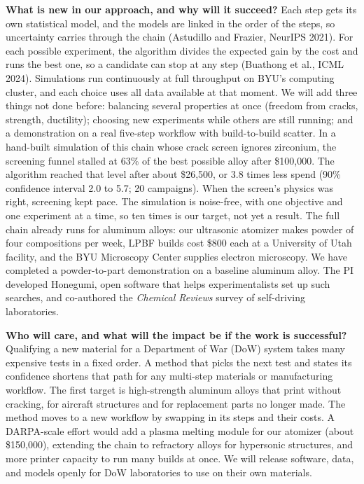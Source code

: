 \documentclass[12pt,letterpaper]{article}
\newcommand{\q}[1]{\textbf{#1}\enspace}
\begin{document}
\q{What is new in our approach, and why will it succeed?}
Each step gets its own statistical model, and the models are linked in the
order of the steps, so uncertainty carries through the chain (Astudillo and
Frazier, NeurIPS 2021). For each possible experiment, the algorithm divides
the expected gain by the cost and runs the best one, so a candidate can stop
at any step (Buathong et al., ICML 2024). Simulations run continuously at full
throughput on BYU's computing cluster, and each choice uses all data available at that
moment. We will add three things not done before: balancing several
properties at once (freedom from cracks, strength, ductility); choosing new
experiments while others are still running; and a demonstration on a real
five-step workflow with build-to-build scatter. In a hand-built simulation of
this chain whose crack screen ignores zirconium, the screening funnel
stalled at 63\% of the best possible alloy after \$100,000. The algorithm
reached that level after about \$26,500, or 3.8 times less spend (90\%
confidence interval 2.0 to 5.7; 20 campaigns). When the screen's physics was
right, screening kept pace. The simulation is noise-free, with one objective
and one experiment at a time, so ten times is our target, not yet a
result. The
full chain already runs for aluminum alloys: our ultrasonic atomizer makes
powder of four compositions per week, LPBF builds cost \$800 each at a
University of Utah facility, and the BYU Microscopy Center supplies electron
microscopy. We have completed a powder-to-part demonstration on a baseline
aluminum alloy. The PI developed Honegumi, open software that helps
experimentalists set up such searches, and co-authored the
\emph{Chemical Reviews} survey of self-driving laboratories.

\q{Who will care, and what will the impact be if the work is successful?}
Qualifying a new material for a Department of War (DoW) system takes many
expensive tests in a fixed order. A method that picks the next test and
states its confidence shortens that path for any multi-step materials or
manufacturing workflow. The first target is high-strength aluminum alloys
that print without cracking, for aircraft structures and for replacement
parts no longer made. The method moves to a new workflow by swapping in its
steps and their costs. A DARPA-scale effort would add a plasma melting module
for our atomizer (about \$150,000), extending the chain to refractory alloys
for hypersonic structures, and more printer capacity to run many builds at
once. We will release software, data, and models openly for DoW
laboratories to use on their own materials.
\end{document}
